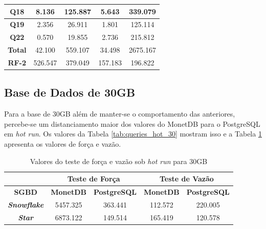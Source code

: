 \begin{table}[t]
\begin{tabular}{|c|c|c|c|c|}
        \textbf{Q18}   & 8.136             & 125.887             & 5.643            & 339.079             \\ \hline
        \textbf{Q19}   & 2.356             & 26.911              & 1.801            & 125.114             \\ \hline
        \textbf{Q22}   & 0.570             & 19.855              & 2.736            & 215.812             \\ \hline
        \textbf{Total} & 42.100            & 559.107             & 34.498           & 2675.167            \\ \hline
        \textbf{RF-2}  & 526.547           & 379.049             & 157.183          & 196.822             \\ \hline
        \end{tabular}
\end{table}

\subsection{Base de Dados de 30GB}

Para a base de 30GB além de manter-se o comportamento das anteriores, percebe-se um distanciamento maior dos valores do MonetDB para o PostgreSQL em \textit{hot run}. Os valores da Tabela \ref{tab:queries_hot_30} mostram isso e a Tabela \ref{tab:forca_vazao_hot_30} apresenta os valores de força e vazão.

\begin{table}[htpb]
        \centering
        \caption{Valores do teste de força e vazão sob \textit{hot run} para 30GB}
        \label{tab:forca_vazao_hot_30}
        \begin{tabular}{|c|c|c|c|c|}
        \hline
                                & \multicolumn{2}{c|}{\textbf{Teste de Força}} & \multicolumn{2}{c|}{\textbf{Teste de Vazão}} \\ \hline
        \textbf{SGBD}      & \textbf{MonetDB}    & \textbf{PostgreSQL}    & \textbf{MonetDB}    & \textbf{PostgreSQL}    \\ \hline
        \textit{\textbf{Snowflake}} & 5457.325            & 363.441                & 112.572             & 220.005                \\ \hline
        \textit{\textbf{Star}}      & 6873.122            & 149.514                & 165.419             & 120.578                \\ \hline
        \end{tabular}
\end{table}

